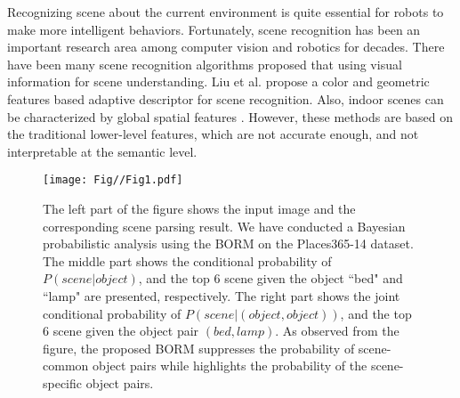 \documentclass[letterpaper, 10 pt, conference]{ieeeconf}  %
\begin{document}
Recognizing scene about the current environment is quite essential for robots to make more intelligent behaviors. Fortunately, scene recognition has been an important research area among computer vision and robotics for decades. There have been many scene recognition algorithms proposed that using visual information for scene understanding. Liu et al. \cite{liu2009scene}\cite{Liu2013} propose a color and geometric features based adaptive descriptor for scene recognition. Also, indoor scenes can be characterized by global spatial features \cite{quattoni2009recognizing}. However, these methods are based on the traditional lower-level features, which are not accurate enough, and not interpretable at the semantic level.

\begin{figure}[tbp]
	\centering
	\texttt{[image: Fig//Fig1.pdf]}
	\caption{The left part of the figure shows the input image and the corresponding scene parsing result. We have conducted a Bayesian probabilistic analysis using the BORM on the Places365-14 dataset. The middle part shows the conditional probability of $P(scene|object)$, and the top 6 scene given the object ``bed" and ``lamp" are presented, respectively. The right part shows the joint conditional probability of $P(scene | (object, object))$, and the top 6 scene given the object pair $(bed, lamp)$. As observed from the figure, the proposed BORM suppresses the probability of scene-common object pairs while highlights the probability of the scene-specific object pairs.}
	\label{fig:joint_prob}
\end{figure}
\end{document}
